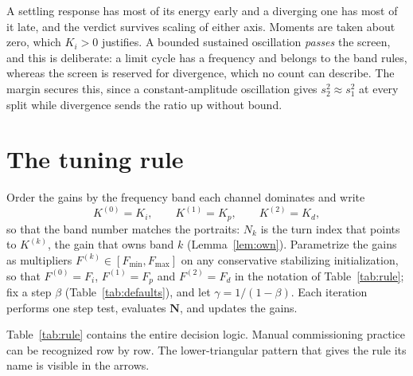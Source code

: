 \documentclass[final,3p,times,twocolumn]{elsarticle}
\newcommand{\fix}[1]{#1}  %
\begin{document}
A settling response has most of its energy early and a diverging one has
most of it late, and the verdict survives scaling of either axis.
Moments are taken about zero, which $K_i > 0$ justifies. A bounded sustained oscillation
\emph{passes} the screen, and this is deliberate: a limit cycle has a
frequency and belongs to the band rules, whereas the screen is reserved
for divergence, which no count can describe. \fix{The margin secures
this, since a constant-amplitude oscillation gives
$s_2^2 \approx s_1^2$ at every split while divergence sends the ratio up
without bound.}

\section{The tuning rule}
\label{sec:rule}

Order the gains by the frequency band each channel
dominates and write
\begin{equation}
K^{(0)} = K_i, \qquad K^{(1)} = K_p, \qquad K^{(2)} = K_d,
\end{equation}
so that the band number matches the portraits: $N_k$ is the turn index
that points to $K^{(k)}$, the gain that owns band $k$
(Lemma~\ref{lem:own}). Parametrize the gains as multipliers
$F^{(k)} \in [F_{\min}, F_{\max}]$ on any conservative stabilizing
initialization, so that $F^{(0)} = F_i$, $F^{(1)} = F_p$ and
$F^{(2)} = F_d$ in the notation of Table~\ref{tab:rule};
fix a step $\beta$ (Table~\ref{tab:defaults}), and let
$\gamma = 1/(1-\beta)$. Each iteration performs one step test,
evaluates $\mathbf N$, and updates the gains.

Table~\ref{tab:rule} contains the entire decision logic. Manual
commissioning practice can be recognized row by row. The
lower-triangular pattern that gives the rule its name is visible in the
arrows.
\end{document}

